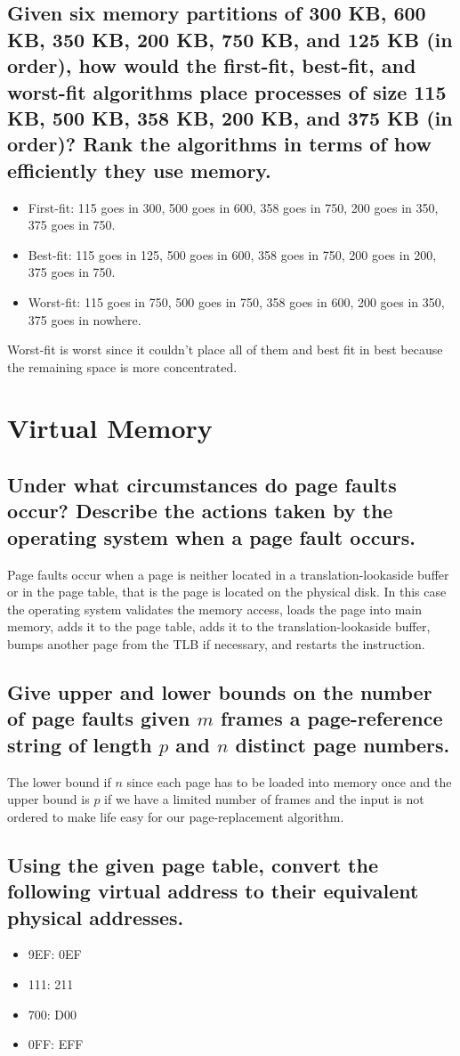 \documentclass{book}%
\begin{document}
\section{Given six memory partitions of 300 KB, 600 KB, 350 KB, 200 KB, 750 KB,
and 125 KB (in order), how would the first-fit, best-fit, and worst-fit
algorithms place processes of size 115 KB, 500 KB, 358 KB, 200 KB, and 375 KB
(in order)? Rank the algorithms in terms of how efficiently they use memory.}
\begin{itemize}
\item First-fit: 115 goes in 300, 500 goes in 600, 358 goes in 750, 200 goes in
350, 375 goes in 750.
\item Best-fit: 115 goes in 125, 500 goes in 600, 358 goes in 750, 200 goes in
200, 375 goes in 750.
\item Worst-fit: 115  goes in 750, 500 goes in 750, 358 goes in 600, 200 goes in
350, 375 goes in nowhere. 
\end{itemize}
Worst-fit is worst since it couldn't place all of them and best fit in best
because the remaining space is more concentrated.
\chapter{Virtual Memory}
\section{Under what circumstances do page faults occur? Describe the actions
taken by the operating system when a page fault occurs.}
Page faults occur when a page is neither located in a translation-lookaside
buffer or in the page table, that is the page is located on the physical disk.
In this case the operating system validates the memory access, loads the page
into main memory, adds it to the page table, adds it to the 
translation-lookaside buffer, bumps another page from the TLB if necessary, and
restarts the instruction.
\section{Give upper and lower bounds on the number of page faults given $m$
frames a page-reference string of length $p$ and $n$ distinct page numbers.}
The lower bound if $n$ since each page has to be loaded into memory once and the
upper bound is $p$ if we have a limited number of frames and the input is not
ordered to make life easy for our page-replacement algorithm.
\section{Using the given page table, convert the following virtual address to
their equivalent physical addresses.}
\begin{itemize}
\item 9EF: 0EF
\item 111: 211
\item 700: D00
\item 0FF: EFF
\end{itemize}
\end{document}
